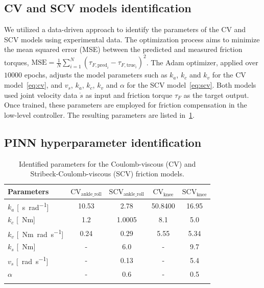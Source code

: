 \subsection{CV and SCV models identification}
\label{sec:whitebox}

We utilized a data-driven approach to identify the parameters of the CV and SCV models using experimental data. The optimization process aims to minimize the mean squared error (MSE) between the predicted and measured friction torques,
\mbox{$\text{MSE} = \frac{1}{N} \sum_{i=1}^{N} ({\tau_{F, \text{pred}_i}} - {\tau_{F, \text{true}_i}})^2$}.
 The Adam optimizer, applied over $10000$ epochs, adjusts the model parameters such as $k_a$, $k_c$ and $k_v$ for the CV model~\eqref{eq:cv}, and $v_s$, $k_a$, $k_c$, $k_v$ and $\alpha$ for the SCV model~\eqref{eq:scv}. Both models used joint velocity data $\dot{s}$ as input and friction torque $\tau_F$ as the target output. Once trained, these parameters are employed for friction compensation in the low-level controller. The resulting parameters are listed in~\ref{table:cvscv}.

\subsection{PINN hyperparameter identification}

\begin{table}[t]
\centering
\caption{Identified parameters for the Coulomb-viscous (CV) and Stribeck-Coulomb-viscous (SCV) friction models.}
\setlength{\tabcolsep}{4pt}
\begin{tabular}{lcccc}
\hline
\textbf{Parameters} & $\text{CV}_{\text{ankle\_roll}}$ & $\text{SCV}_{\text{ankle\_roll}}$ & $\text{CV}_{\text{knee}}$ & $\text{SCV}_{\text{knee}}$ \\ 
\hline
$k_a$ [\SI{}{s\per rad}] & 10.53 & 2.78 & 50.8400 & 16.95 \\ 
$k_c$ [\SI{}{Nm}] & 1.2 & 1.0005 & 8.1 & 5.0 \\ 
$k_v$ [\SI{}{Nm.rad\per\second}] & 0.24 & 0.29 & 5.55 & 5.34 \\ 
$k_s$ [\SI{}{Nm}] & - & 6.0 & - & 9.7 \\ 
$v_s$ [\SI{}{rad\per\second}] & - & 0.13 &  -  & 5.4 \\ 
$\alpha$ & - & 0.6 & - & 0.5 \\
\hline
\label{table:cvscv}
\vspace{-15pt}
\end{tabular}
\end{table}

